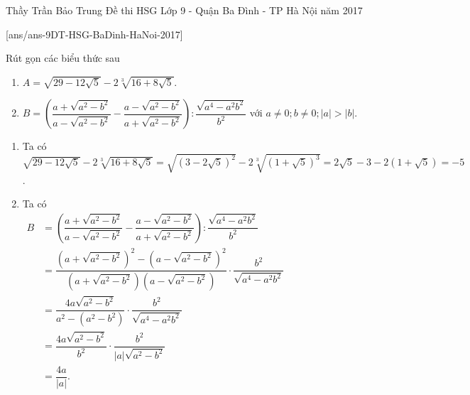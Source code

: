 \begin{name}
{Thầy  Trần Bảo Trung}
{Đề thi HSG Lớp 9 - Quận Ba Đình - TP Hà Nội năm 2017}
\end{name}
\setcounter{ex}{0}
[ans/ans-9DT-HSG-BaDinh-HaNoi-2017]
\begin{ex}%
Rút gọn các biểu thức sau
    \hfill
    \begin{enumerate}
        \item $A=\sqrt{29-12\sqrt{5}}-2\sqrt[3]{16+8\sqrt{5}}$.
        \item $B=\left(\dfrac{a+\sqrt{a^2-b^2}}{a-\sqrt{a^2-b^2}}-\dfrac{a-\sqrt{a^2-b^2}}{a+\sqrt{a^2-b^2}}\right):\dfrac{\sqrt{a^4-a^2 b^2}}{b^2}$ với $a\neq 0; b \neq 0; \vert a\vert>\vert b\vert.$
    \end{enumerate}
\loigiai
    {
    \begin{enumerate}
        \item Ta có\\ $\sqrt{29-12\sqrt{5}}-2\sqrt[3]{16+8\sqrt{5}}=\sqrt{\left(3-2\sqrt{5}\right)^2}-2\sqrt[3]{\left(1+\sqrt{5}\right)^3}=2\sqrt{5}-3-2\left(1+\sqrt{5}\right)=-5$.
	    \item Ta có\\
		$\begin{aligned}
		B &=\left(\dfrac{a+\sqrt{a^2-b^2}}{a-\sqrt{a^2-b^2}}-\dfrac{a-\sqrt{a^2-b^2}}{a+\sqrt{a^2-b^2}}\right):\dfrac{\sqrt{a^4-a^2 b^2}}{b^2}\\   
		&=\dfrac{\left( a+\sqrt{a^2-b^2}\right)^2-\left(a-\sqrt{a^2-b^2} \right)^2}{\left( a+\sqrt{a^2-b^2}\right)\left(a-\sqrt{a^2-b^2} \right)}\cdot\dfrac{b^2}{\sqrt{a^4-a^2b^2}}\\
		&=\dfrac{4a\sqrt{a^2-b^2}}{a^2-\left(a^2-b^2\right)}\cdot\dfrac{b^2}{\sqrt{a^4-a^2b^2}}\\
		&=\dfrac{4a\sqrt{a^2-b^2}}{b^2}\cdot\dfrac{b^2}{\vert a\vert\sqrt{a^2-b^2}}\\
		&=\dfrac{4a}{\vert a\vert}.\end{aligned}	$	    
\end{enumerate}
    }
\end{ex}

